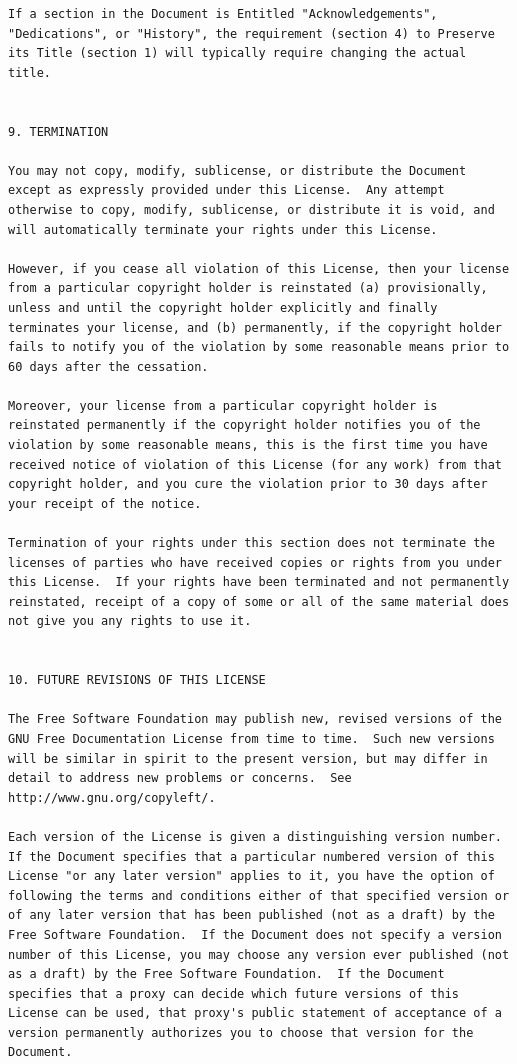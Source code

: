 \documentclass[letterpaper,10pt,english]{sphinxmanual}
\begin{document}
\begin{Verbatim}[commandchars=\\\{\}]
If a section in the Document is Entitled "Acknowledgements",
"Dedications", or "History", the requirement (section 4) to Preserve
its Title (section 1) will typically require changing the actual
title.


9. TERMINATION

You may not copy, modify, sublicense, or distribute the Document
except as expressly provided under this License.  Any attempt
otherwise to copy, modify, sublicense, or distribute it is void, and
will automatically terminate your rights under this License.

However, if you cease all violation of this License, then your license
from a particular copyright holder is reinstated (a) provisionally,
unless and until the copyright holder explicitly and finally
terminates your license, and (b) permanently, if the copyright holder
fails to notify you of the violation by some reasonable means prior to
60 days after the cessation.

Moreover, your license from a particular copyright holder is
reinstated permanently if the copyright holder notifies you of the
violation by some reasonable means, this is the first time you have
received notice of violation of this License (for any work) from that
copyright holder, and you cure the violation prior to 30 days after
your receipt of the notice.

Termination of your rights under this section does not terminate the
licenses of parties who have received copies or rights from you under
this License.  If your rights have been terminated and not permanently
reinstated, receipt of a copy of some or all of the same material does
not give you any rights to use it.


10. FUTURE REVISIONS OF THIS LICENSE

The Free Software Foundation may publish new, revised versions of the
GNU Free Documentation License from time to time.  Such new versions
will be similar in spirit to the present version, but may differ in
detail to address new problems or concerns.  See
http://www.gnu.org/copyleft/.

Each version of the License is given a distinguishing version number.
If the Document specifies that a particular numbered version of this
License "or any later version" applies to it, you have the option of
following the terms and conditions either of that specified version or
of any later version that has been published (not as a draft) by the
Free Software Foundation.  If the Document does not specify a version
number of this License, you may choose any version ever published (not
as a draft) by the Free Software Foundation.  If the Document
specifies that a proxy can decide which future versions of this
License can be used, that proxy's public statement of acceptance of a
version permanently authorizes you to choose that version for the
Document.


\end{Verbatim}
\end{document}
